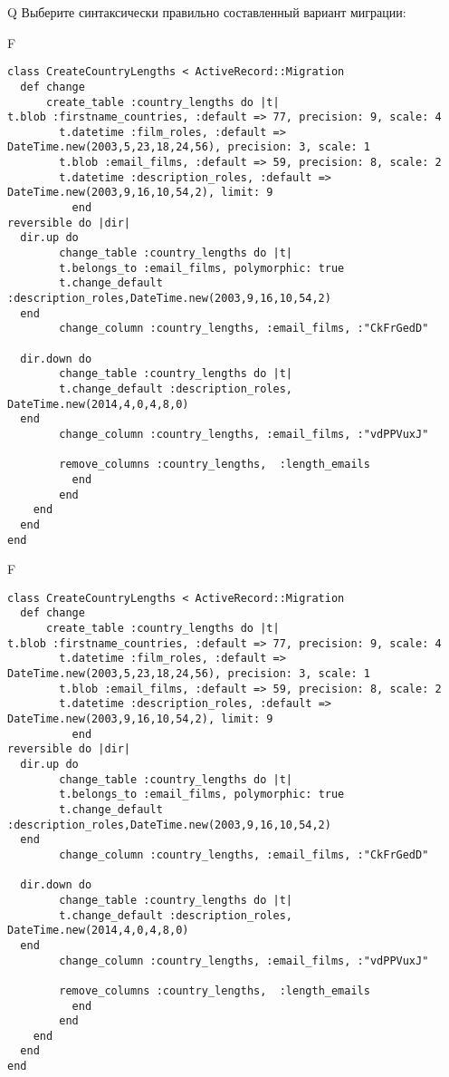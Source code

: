 Q
Выберите синтаксически правильно составленный вариант миграции:

F
\begin{verbatim}
class CreateCountryLengths < ActiveRecord::Migration
  def change
	  create_table :country_lengths do |t|
t.blob :firstname_countries, :default => 77, precision: 9, scale: 4
		t.datetime :film_roles, :default => DateTime.new(2003,5,23,18,24,56), precision: 3, scale: 1
		t.blob :email_films, :default => 59, precision: 8, scale: 2
		t.datetime :description_roles, :default => DateTime.new(2003,9,16,10,54,2), limit: 9
		  end
reversible do |dir|
  dir.up do
		change_table :country_lengths do |t|
		t.belongs_to :email_films, polymorphic: true
 		t.change_default :description_roles,DateTime.new(2003,9,16,10,54,2)
  end
 		change_column :country_lengths, :email_films, :"CkFrGedD"
   
  dir.down do
		change_table :country_lengths do |t|
		t.change_default :description_roles, DateTime.new(2014,4,0,4,8,0)
  end
 		change_column :country_lengths, :email_films, :"vdPPVuxJ"
   
		remove_columns :country_lengths,  :length_emails 
	      end
	    end
    end 
  end
end

\end{verbatim}

F
\begin{verbatim}
class CreateCountryLengths < ActiveRecord::Migration
  def change
	  create_table :country_lengths do |t|
t.blob :firstname_countries, :default => 77, precision: 9, scale: 4
		t.datetime :film_roles, :default => DateTime.new(2003,5,23,18,24,56), precision: 3, scale: 1
		t.blob :email_films, :default => 59, precision: 8, scale: 2
		t.datetime :description_roles, :default => DateTime.new(2003,9,16,10,54,2), limit: 9
		  end
reversible do |dir|
  dir.up do
		change_table :country_lengths do |t|
		t.belongs_to :email_films, polymorphic: true
 		t.change_default :description_roles,DateTime.new(2003,9,16,10,54,2)
  end
 		change_column :country_lengths, :email_films, :"CkFrGedD"
   
  dir.down do
		change_table :country_lengths do |t|
		t.change_default :description_roles, DateTime.new(2014,4,0,4,8,0)
  end
 		change_column :country_lengths, :email_films, :"vdPPVuxJ"
   
		remove_columns :country_lengths,  :length_emails 
	      end
	    end
    end 
  end
end

\end{verbatim}

